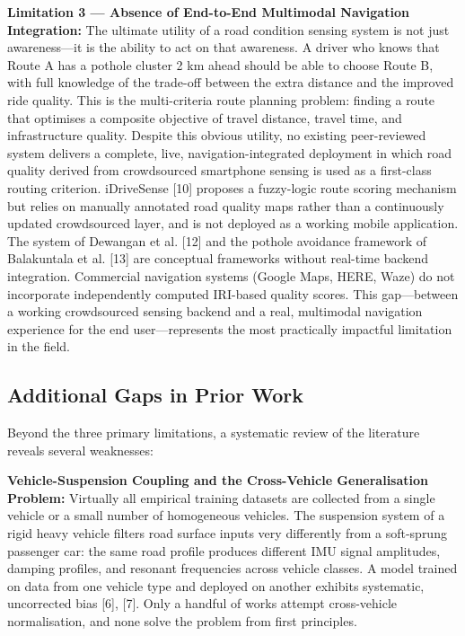 \documentclass[conference]{IEEEtran}
\begin{document}
\textbf{Limitation 3 --- Absence of End-to-End Multimodal Navigation Integration:} The ultimate utility of a road condition sensing system is not just awareness---it is the ability to act on that awareness.
A driver who knows that Route A has a pothole cluster 2 km ahead should be able to choose Route B, with full knowledge of the trade-off between the extra distance and the improved ride quality.
This is the multi-criteria route planning problem: finding a route that optimises a composite objective of travel distance, travel time, and infrastructure quality.
Despite this obvious utility, no existing peer-reviewed system delivers a complete, live, navigation-integrated deployment in which road quality derived from crowdsourced smartphone sensing is used as a first-class routing criterion.
iDriveSense [10] proposes a fuzzy-logic route scoring mechanism but relies on manually annotated road quality maps rather than a continuously updated crowdsourced layer, and is not deployed as a working mobile application.
The system of Dewangan et al. [12] and the pothole avoidance framework of Balakuntala et al.
[13] are conceptual frameworks without real-time backend integration. Commercial navigation systems (Google Maps, HERE, Waze) do not incorporate independently computed IRI-based quality scores.
This gap---between a working crowdsourced sensing backend and a real, multimodal navigation experience for the end user---represents the most practically impactful limitation in the field.

\subsection{Additional Gaps in Prior Work}
Beyond the three primary limitations, a systematic review of the literature reveals several weaknesses:

\textbf{Vehicle-Suspension Coupling and the Cross-Vehicle Generalisation Problem:} Virtually all empirical training datasets are collected from a single vehicle or a small number of homogeneous vehicles.
The suspension system of a rigid heavy vehicle filters road surface inputs very differently from a soft-sprung passenger car: the same road profile produces different IMU signal amplitudes, damping profiles, and resonant frequencies across vehicle classes.
A model trained on data from one vehicle type and deployed on another exhibits systematic, uncorrected bias [6], [7].
Only a handful of works attempt cross-vehicle normalisation, and none solve the problem from first principles.
\end{document}

